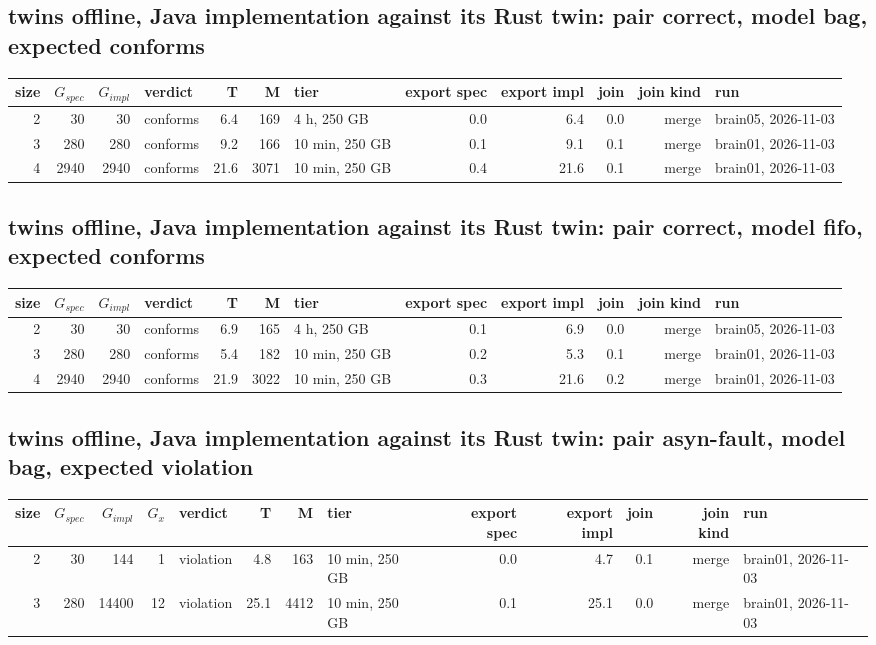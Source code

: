 \documentclass[10pt]{article}
\begin{document}
\subsection*{twins offline, Java implementation against its Rust twin: pair \textsf{correct}, model bag, expected conforms}
\begin{longtable}{@{}rrrlrrlrrrrl@{}}
\toprule
size & $G_{\mathit{spec}}$ & $G_{\mathit{impl}}$ & verdict & T & M & tier & export spec & export impl & join & join kind & run \\
\midrule
\endhead
\color{blue} 2 & 30 & 30 & conforms & 6.4 & 169 & 4 h, 250 GB & 0.0 & 6.4 & 0.0 & merge & brain05, 2026-11-03 \\
\color{blue} 3 & 280 & 280 & conforms & 9.2 & 166 & 10 min, 250 GB & 0.1 & 9.1 & 0.1 & merge & brain01, 2026-11-03 \\
\color{blue} 4 & 2940 & 2940 & conforms & 21.6 & 3071 & 10 min, 250 GB & 0.4 & 21.6 & 0.1 & merge & brain01, 2026-11-03 \\
\bottomrule
\end{longtable}
\subsection*{twins offline, Java implementation against its Rust twin: pair \textsf{correct}, model fifo, expected conforms}
\begin{longtable}{@{}rrrlrrlrrrrl@{}}
\toprule
size & $G_{\mathit{spec}}$ & $G_{\mathit{impl}}$ & verdict & T & M & tier & export spec & export impl & join & join kind & run \\
\midrule
\endhead
\color{blue} 2 & 30 & 30 & conforms & 6.9 & 165 & 4 h, 250 GB & 0.1 & 6.9 & 0.0 & merge & brain05, 2026-11-03 \\
\color{blue} 3 & 280 & 280 & conforms & 5.4 & 182 & 10 min, 250 GB & 0.2 & 5.3 & 0.1 & merge & brain01, 2026-11-03 \\
\color{blue} 4 & 2940 & 2940 & conforms & 21.9 & 3022 & 10 min, 250 GB & 0.3 & 21.6 & 0.2 & merge & brain01, 2026-11-03 \\
\bottomrule
\end{longtable}
\subsection*{twins offline, Java implementation against its Rust twin: pair \textsf{asyn-fault}, model bag, expected violation}
\begin{longtable}{@{}rrrrlrrlrrrrl@{}}
\toprule
size & $G_{\mathit{spec}}$ & $G_{\mathit{impl}}$ & $G_x$ & verdict & T & M & tier & export spec & export impl & join & join kind & run \\
\midrule
\endhead
\color{blue} 2 & 30 & 144 & 1 & violation & 4.8 & 163 & 10 min, 250 GB & 0.0 & 4.7 & 0.1 & merge & brain01, 2026-11-03 \\
\color{blue} 3 & 280 & 14400 & 12 & violation & 25.1 & 4412 & 10 min, 250 GB & 0.1 & 25.1 & 0.0 & merge & brain01, 2026-11-03 \\
\bottomrule
\end{longtable}
\end{document}
